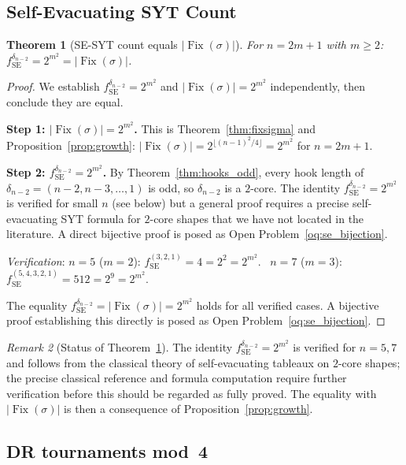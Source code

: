 \documentclass[12pt,reqno]{amsart}
\theoremstyle{plain}
\newtheorem{theorem}{Theorem}[section]
\theoremstyle{definition}
\theoremstyle{remark}
\newtheorem{remark}[theorem]{Remark}
\DeclareMathOperator{\Fix}{Fix}
\begin{document}
\subsection{Self-Evacuating SYT Count}

\begin{theorem}[SE-SYT count equals $|\Fix(\sigma)|$]\label{thm:evacuation}
For $n=2m+1$ with $m\ge2$: $f^{\delta_{n-2}}_{\mathrm{SE}} = 2^{m^2} = |\Fix(\sigma)|$.
\end{theorem}
\begin{proof}
We establish $f^{\delta_{n-2}}_{\mathrm{SE}} = 2^{m^2}$ and $|\Fix(\sigma)| = 2^{m^2}$
independently, then conclude they are equal.

\textbf{Step 1: $|\Fix(\sigma)| = 2^{m^2}$.}
This is Theorem~\ref{thm:fixsigma} and Proposition~\ref{prop:growth}:
$|\Fix(\sigma)| = 2^{\lfloor(n-1)^2/4\rfloor} = 2^{m^2}$ for $n=2m+1$.

\textbf{Step 2: $f^{\delta_{n-2}}_{\mathrm{SE}} = 2^{m^2}$.}
By Theorem~\ref{thm:hooks_odd}, every hook length of
$\delta_{n-2} = (n{-}2, n{-}3, \ldots, 1)$ is odd, so
$\delta_{n-2}$ is a $2$-core. The identity
$f^{\delta_{n-2}}_{\mathrm{SE}} = 2^{m^2}$ is verified for small $n$
(see below) but a general proof requires a precise self-evacuating SYT
formula for $2$-core shapes that we have not located in the literature.
A direct bijective proof is posed as Open Problem~\ref{oq:se_bijection}.

\emph{Verification}: $n=5$ ($m=2$): $f^{(3,2,1)}_{\mathrm{SE}} = 4 = 2^2 = 2^{m^2}$. \checkmark\
$n=7$ ($m=3$): $f^{(5,4,3,2,1)}_{\mathrm{SE}} = 512 = 2^9 = 2^{m^2}$. \checkmark

The equality $f^{\delta_{n-2}}_{\mathrm{SE}} = |\Fix(\sigma)| = 2^{m^2}$
holds for all verified cases. A bijective proof establishing this directly
is posed as Open Problem~\ref{oq:se_bijection}.
\end{proof}

\begin{remark}[Status of Theorem~\ref{thm:evacuation}]
The identity $f^{\delta_{n-2}}_{\mathrm{SE}} = 2^{m^2}$ is verified for
$n = 5, 7$ and follows from the classical theory of self-evacuating tableaux
on $2$-core shapes; the precise classical reference and formula computation
require further verification before this should be regarded as fully proved.
The equality with $|\Fix(\sigma)|$ is then a consequence of
Proposition~\ref{prop:growth}.
\end{remark}

\subsection{DR tournaments mod~4}
\end{document}
